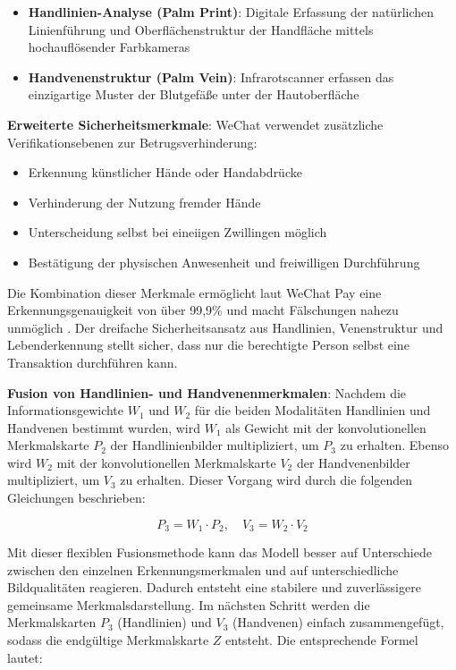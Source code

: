 \documentclass[paper=a4,fontsize=12pt,ngerman]{scrartcl}
\begin{document}
\begin{itemize}
\item \textbf{Handlinien-Analyse (Palm Print)}: Digitale Erfassung der natürlichen 
Linienführung und Oberflächenstruktur der Handfläche mittels hochauflösender 
Farbkameras
\item \textbf{Handvenenstruktur (Palm Vein)}: Infrarotscanner erfassen das 
einzigartige Muster der Blutgefäße unter der Hautoberfläche
\end{itemize}

\textbf{Erweiterte Sicherheitsmerkmale}: WeChat verwendet zusätzliche 
Verifikationsebenen zur Betrugsverhinderung:
\begin{itemize}
\item Erkennung künstlicher Hände oder Handabdrücke
\item Verhinderung der Nutzung fremder Hände
\item Unterscheidung selbst bei eineiigen Zwillingen möglich
\item Bestätigung der physischen Anwesenheit und freiwilligen Durchführung
\end{itemize}

Die Kombination dieser Merkmale ermöglicht laut WeChat Pay eine 
Erkennungsgenauigkeit von über 99,9\% und macht Fälschungen nahezu 
unmöglich \cite{pan2024palm}. Der dreifache Sicherheitsansatz aus Handlinien, 
Venenstruktur und Lebenderkennung stellt sicher, dass nur die berechtigte 
Person selbst eine Transaktion durchführen kann.\cite{haoMiao2025wechat}

\textbf{Fusion von Handlinien- und Handvenenmerkmalen}: Nachdem die Informationsgewichte $W_1$ und $W_2$ für die beiden Modalitäten Handlinien und Handvenen bestimmt wurden, wird $W_1$ als Gewicht mit der konvolutionellen Merkmalskarte $P_2$ der Handlinienbilder multipliziert, um $P_3$ zu erhalten. Ebenso wird $W_2$ mit der konvolutionellen Merkmalskarte $V_2$ der Handvenenbilder multipliziert, um $V_3$ zu erhalten. Dieser Vorgang wird durch die folgenden Gleichungen beschrieben:


\begin{equation}
P_3 = W_1 \cdot P_2,\quad V_3 = W_2 \cdot V_2
\end{equation}

Mit dieser flexiblen Fusionsmethode kann das Modell besser auf Unterschiede zwischen den einzelnen Erkennungsmerkmalen und auf unterschiedliche Bildqualitäten reagieren. Dadurch entsteht eine stabilere und zuverlässigere gemeinsame Merkmalsdarstellung. Im nächsten Schritt werden die Merkmalskarten $P_3$ (Handlinien) und $V_3$ (Handvenen) einfach zusammengefügt, sodass die endgültige Merkmalskarte $Z$ entsteht. Die entsprechende Formel lautet:
\end{document}
